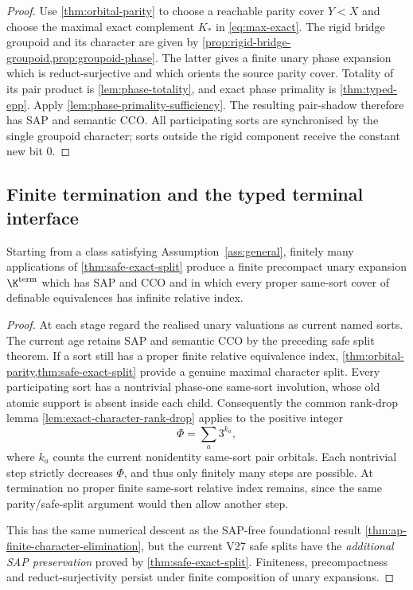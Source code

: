 \begin{proof}
Use \cref{thm:orbital-parity} to choose a reachable parity cover $Y<X$ and
choose the maximal exact complement $K_*$ in \eqref{eq:max-exact}.  The rigid
bridge groupoid and its character are given by
\cref{prop:rigid-bridge-groupoid,prop:groupoid-phase}.  The latter gives a
finite unary phase expansion which is reduct-surjective and which orients the
source parity cover.  Totality of its pair product is
\cref{lem:phase-totality}, and exact phase primality is
\cref{thm:typed-epp}.  Apply
\cref{lem:phase-primality-sufficiency}.  The resulting pair-shadow therefore
has SAP and semantic CCO.  All participating sorts are synchronised by the
single groupoid character; sorts outside the rigid component receive the
constant new bit $0$.
\end{proof}

\subsection{Finite termination and the typed terminal interface}

\begin{theorem}
\label{thm:finite-cover-elimination}
Starting from a class satisfying Assumption~\ref{ass:general}, finitely many
applications of \cref{thm:safe-exact-split} produce a finite precompact unary
expansion $\K^{\mathrm{term}}$ which has SAP and CCO and in which every proper
same-sort cover of definable equivalences has infinite relative index.
\end{theorem}

\begin{proof}
At each stage regard the realised unary valuations as
current named sorts. The current age retains SAP and
semantic CCO by the preceding safe split theorem.
If a sort still has a proper finite relative
equivalence index,
\cref{thm:orbital-parity,thm:safe-exact-split}
provide a genuine maximal character split.
Every participating sort has a nontrivial
phase-one same-sort involution, whose old
atomic support is absent inside each child.
Consequently the common rank-drop lemma
\cref{lem:exact-character-rank-drop}
applies to the positive integer
\[
                      \Phi=\sum_a3^{k_a},
\]
where $k_a$ counts the current nonidentity
same-sort pair orbitals. Each nontrivial step
strictly decreases $\Phi$, and thus only
finitely many steps are possible.
At termination no proper finite same-sort
relative index remains, since the same
parity/safe-split argument would then allow
another step.

This has the same numerical descent as the
SAP-free foundational result
\cref{thm:ap-finite-character-elimination},
but the current V27 safe splits have the
\emph{additional SAP preservation} proved
by \cref{thm:safe-exact-split}. Finiteness,
precompactness and reduct-surjectivity persist
under finite composition of unary expansions.
\end{proof}

